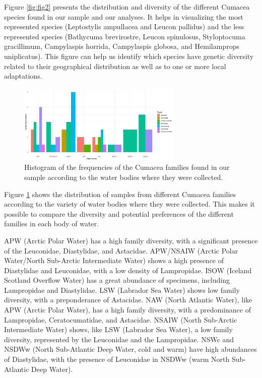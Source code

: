Figure \ref{fig:fig2} presents the distribution and diversity of the different Cumacea species found in our sample and our analyses. It helps in visualizing the most represented species (Leptostylis ampullacea and Leucon pallidus) and the less represented species (Bathycuma brevirostre, Leucon spinulosus, Styloptocuma gracillimum, Campylaspis horrida, Campylaspis globosa, and Hemilamprops uniplicatus). This figure can help us identify which species have genetic diversity related to their geographical distribution as well as to one or more local adaptations.

\begin{figure}[]
    \centering
    \includegraphics[width=0.7\textwidth]{figure3.png}
    \caption{Histogram of the frequencies of the Cumacea families found in our sample according to the water bodies where they were collected. \label{fig:fig3}}
\end{figure}

Figure \ref{fig:fig3} shows the distribution of samples from different Cumacea families according to the variety of water bodies where they were collected. This makes it possible to compare the diversity and potential preferences of the different families in each body of water. 

APW (Arctic Polar Water) has a high family diversity, with a significant presence of the Leuconidae, Diastylidae, and Astacidae. APW/NSAIW (Arctic Polar Water/North Sub-Arctic Intermediate Water) shows a high presence of Diastylidae and Leuconidae, with a low density of Lampropidae. ISOW (Iceland Scotland Overflow Water) has a great abundance of specimens, including Lampropidae and  Diastylidae. LSW (Labrador Sea Water) shows low family diversity, with a preponderance of Astacidae. NAW (North Atlantic Water), like APW (Arctic Polar Water), has a high family diversity, with a predominance of Lampropidae, Ceratocumatidae, and Astacidae. NSAIW (North Sub-Arctic Intermediate Water) shows, like LSW (Labrador Sea Water), a low family diversity, represented by the Leuconidae and the Lampropidae. NSWc and NSDWw (North Sub-Atlantic Deep Water, cold and warm) have high abundances of Diastylidae, with the presence of Leuconidae in NSDWw (warm North Sub-Atlantic Deep Water).

